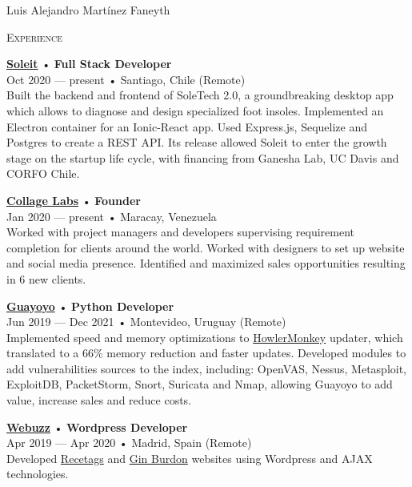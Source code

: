 \documentclass[12pt]{article}
\begin{document}
\begin{cv}{Luis Alejandro Mart\'inez Faneyth}
\begin{minipage}[t]{0.55\textwidth}
    \textrm{\textsc{\Large{Experience}}}
    \newline
    \parbox[t]{\linewidth}{
      \textbf{\href{http://soleit.app}{Soleit}} • \textrm{\textbf{Full Stack Developer}}\\
      Oct 2020 --- present • Santiago, Chile (Remote)\\
      \footnotesize{Built the backend and frontend of SoleTech 2.0, a groundbreaking desktop app which allows to diagnose and design specialized foot insoles. Implemented an Electron container for an Ionic-React app. Used Express.js, Sequelize and Postgres to create a REST API. Its release allowed Soleit to enter the growth stage on the startup life cycle, with financing from Ganesha Lab, UC Davis and CORFO Chile.}\\
    }\vspace{0.125em}
    \parbox[t]{\linewidth}{
      \textbf{\href{http://collagelabs.org}{Collage Labs}} • \textrm{\textbf{Founder}}\\
      Jan 2020 --- present • Maracay, Venezuela\\
      \footnotesize{Worked with project managers and developers supervising requirement completion for clients around the world. Worked with designers to set up website and social media presence. Identified and maximized sales opportunities resulting in 6 new clients.}\\
    }\vspace{0.125em}
    \parbox[t]{\linewidth}{
      \textbf{\href{https://guayoyo.io}{Guayoyo}} • \textrm{\textbf{Python Developer}}\\
      Jun 2019 --- Dec 2021 • Montevideo, Uruguay (Remote)\\
      \footnotesize{Implemented speed and memory optimizations to \href{https://howlermonkey.io}{HowlerMonkey} updater, which translated to a 66\% memory reduction and faster updates. Developed modules to add vulnerabilities sources to the index, including: OpenVAS, Nessus, Metasploit, ExploitDB, PacketStorm, Snort, Suricata and Nmap, allowing Guayoyo to add value, increase sales and reduce costs.}\\
    }\vspace{0.125em}
    \parbox[t]{\linewidth}{
      \textbf{\href{https://web.archive.org/web/20180413143616/https://webuzz.es/}{Webuzz}} • \textrm{\textbf{Wordpress Developer}}\\
      Apr 2019 --- Apr 2020 • Madrid, Spain (Remote)\\
      \footnotesize{Developed \href{https://recetags.com}{Recetags} and \href{https://ginburdon.com}{Gin Burdon} websites using Wordpress and AJAX technologies.}\\
}
\end{minipage}
\end{cv}
\end{document}
